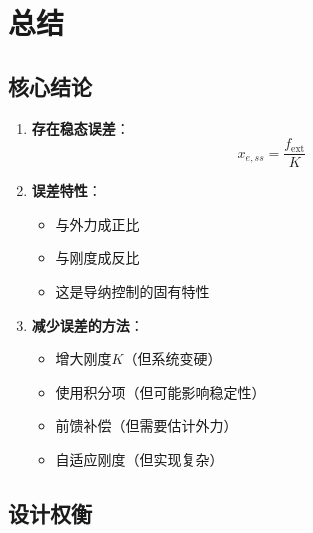 \documentclass[12pt,a4paper]{article}
\begin{document}
\section{总结}

\subsection{核心结论}

\begin{enumerate}
\item \textbf{存在稳态误差}：
\begin{equation}
x_{e,ss} = \frac{f_{\text{ext}}}{K}
\end{equation}

\item \textbf{误差特性}：
\begin{itemize}
\item 与外力成正比
\item 与刚度成反比
\item 这是导纳控制的固有特性
\end{itemize}

\item \textbf{减少误差的方法}：
\begin{itemize}
\item 增大刚度$K$（但系统变硬）
\item 使用积分项（但可能影响稳定性）
\item 前馈补偿（但需要估计外力）
\item 自适应刚度（但实现复杂）
\end{itemize}
\end{enumerate}

\subsection{设计权衡}
\end{document}
